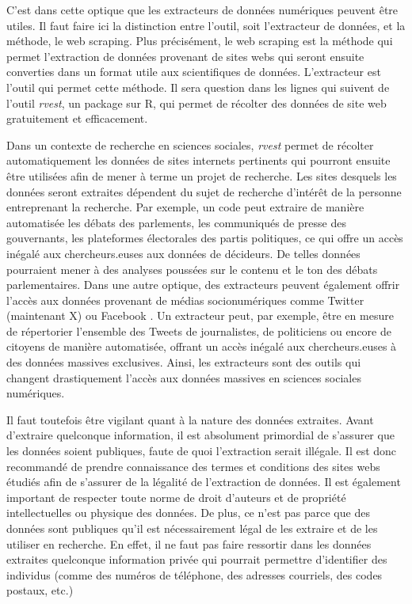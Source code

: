 \documentclass[
  letterpaper,
  DIV=11,
  numbers=noendperiod]{scrreprt}
\begin{document}
C'est dans cette optique que les extracteurs de données numériques
peuvent être utiles. Il faut faire ici la distinction entre l'outil,
soit l'extracteur de données, et la méthode, le web scraping. Plus
précisément, le web scraping est la méthode qui permet l'extraction de
données provenant de sites webs qui seront ensuite converties dans un
format utile aux scientifiques de données. L'extracteur est l'outil qui
permet cette méthode. Il sera question dans les lignes qui suivent de
l'outil \emph{rvest}, un package sur R, qui permet de récolter des
données de site web gratuitement et efficacement.

Dans un contexte de recherche en sciences sociales, \emph{rvest} permet
de récolter automatiquement les données de sites internets pertinents
qui pourront ensuite être utilisées afin de mener à terme un projet de
recherche. Les sites desquels les données seront extraites dépendent du
sujet de recherche d'intérêt de la personne entreprenant la recherche.
Par exemple, un code peut extraire de manière automatisée les débats des
parlements, les communiqués de presse des gouvernants, les plateformes
électorales des partis politiques, ce qui offre un accès inégalé aux
chercheurs.euses aux données de décideurs. De telles données pourraient
mener à des analyses poussées sur le contenu et le ton des débats
parlementaires. Dans une autre optique, des extracteurs peuvent
également offrir l'accès aux données provenant de médias socionumériques
comme Twitter (maintenant X) ou Facebook . Un extracteur peut, par
exemple, être en mesure de répertorier l'ensemble des Tweets de
journalistes, de politiciens ou encore de citoyens de manière
automatisée, offrant un accès inégalé aux chercheurs.euses à des données
massives exclusives. Ainsi, les extracteurs sont des outils qui changent
drastiquement l'accès aux données massives en sciences sociales
numériques.

Il faut toutefois être vigilant quant à la nature des données extraites.
Avant d'extraire quelconque information, il est absolument primordial de
s'assurer que les données soient publiques, faute de quoi l'extraction
serait illégale. Il est donc recommandé de prendre connaissance des
termes et conditions des sites webs étudiés afin de s'assurer de la
légalité de l'extraction de données. Il est également important de
respecter toute norme de droit d'auteurs et de propriété intellectuelles
ou physique des données. De plus, ce n'est pas parce que des données
sont publiques qu'il est nécessairement légal de les extraire et de les
utiliser en recherche. En effet, il ne faut pas faire ressortir dans les
données extraites quelconque information privée qui pourrait permettre
d'identifier des individus (comme des numéros de téléphone, des adresses
courriels, des codes postaux, etc.)
\end{document}
